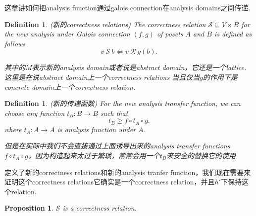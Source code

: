 \documentclass{article}
\newtheorem{proposition}[theorem]{Proposition}
\newtheorem{definition}[theorem]{Definition}
\newcommand*{\xfunc}[4]{{#2}\colon{#3}{#1}{#4}}
\newcommand*{\func}[3]{\xfunc{\to}{#1}{#2}{#3}}
\begin{document}
{\color{red} 这章讲如何把analysis function通过galois connection在analysis domains之间传递}.

\begin{definition}
\rm {\color{red}(新的correctness relations)} The correctness relation $\mathcal{S} \subseteq V \times B$ for the new analysis under Galois connection $(f,g)$ of posets $A$ and $B$ is defined as follows
$$
v~\mathcal{S}~b \iff v~\mathcal{R}~g(b).
$$

{\color{red} 其中的$M$表示新的analysis domain或者说是abstract domain，它还是一个lattice}. {\color{blue} 这里是在说abstract domain上一个correctness relations 当且仅当$g$的作用下是concrete domain上一个correctness relation}.
\end{definition}


\begin{definition}
\rm {\color{red} (新的传递函数)} For the new analysis transfer function, we can choose any function $\func{t_B}{B}{B}$ such that
$$
t_B \geq f \circ t_A \circ g.
$$
where $\func{t_A}{A}{A}$ is analysis function under $A$.
\begin{center}
\end{center}
{\color{blue} 但是在实际中我们不会直接通过上面诱导出来的analysis transfer functions $f \circ t_A \circ g$，因为构造起来太过于繁琐，常常会用一个$t_B$来安全的替换它的使用}
\end{definition}



{\color{red} 定义了新的correctness relations和新的analysis tranfer function，我们现在需要来证明这个correctness relations它确实是一个correctness relation，并且$h'$下保持这个relation}.

\begin{proposition}
\rm $\mathcal{S}$ is a correctness relation.
\end{proposition}
\end{document}
